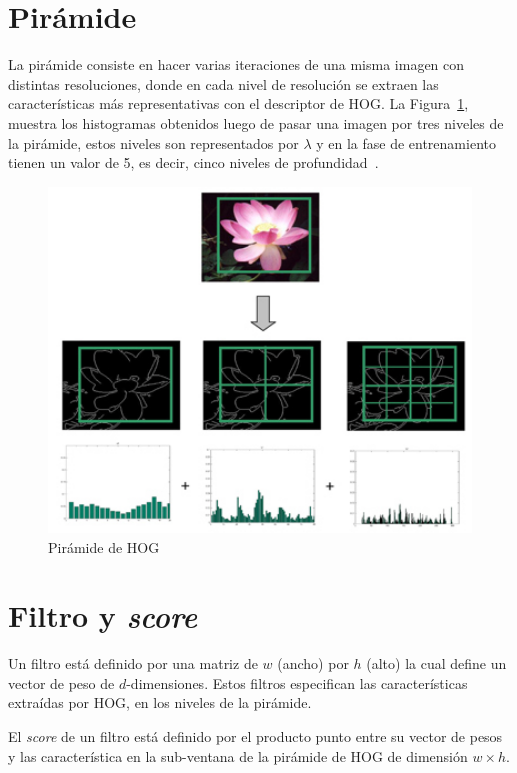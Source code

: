 \section{Pirámide}\label{sec:pyra}
La pirámide consiste en hacer varias iteraciones de una misma imagen con distintas resoluciones, donde en cada nivel de resolución se extraen las características más representativas con el descriptor de HOG\@. La Figura~\ref{fig:hog_pyra}, muestra los histogramas obtenidos luego de pasar una imagen por tres niveles de la pirámide, estos niveles son representados por $\lambda$ y en la fase de entrenamiento tienen un valor de 5, es decir, cinco niveles de profundidad~\cite{Felzenszwalb2010}.

\begin{figure}[tb]
 \centering
  \includegraphics[width=1\textwidth]{Figuras/phog.jpg}
  \caption[Pirámide de HOG]{Pirámide de HOG~\cite{pyra}}
  \label{fig:hog_pyra}
\end{figure}

\section{Filtro y \textit{score}}\label{sec:fas}

Un filtro está definido por una matriz de $w$ (ancho) por $h$ (alto) la cual define un vector de peso de $d$-dimensiones. Estos filtros especifican las características extraídas por HOG, en los niveles de la pirámide.

El \textit{score} de un filtro está definido por el producto punto entre su vector de pesos y las característica en la sub-ventana de la pirámide de HOG de dimensión $w \times h$.
